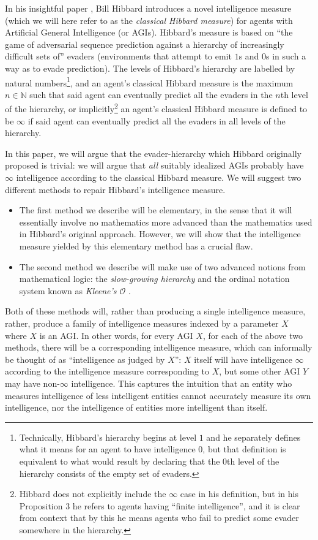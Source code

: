 \documentclass{article}
\begin{document}
In his insightful paper \cite{hibbard}, Bill Hibbard introduces a novel
intelligence measure (which we will here refer to as the \emph{classical Hibbard measure})
for agents with Artificial General Intelligence (or AGIs).
Hibbard's measure is based on ``the game of adversarial sequence prediction
against a hierarchy of increasingly difficult sets of'' evaders (environments that attempt
to emit $1$s and $0$s in such a way as to evade prediction).
The levels of Hibbard's hierarchy are labelled by natural numbers\footnote{Technically,
Hibbard's hierarchy begins at level $1$ and he separately defines what it means for
an agent to have intelligence $0$, but that definition is equivalent to what would result
by declaring that the $0$th level of the hierarchy consists of the empty set of evaders.}, and
an agent's classical Hibbard measure is the maximum $n\in\mathbb N$ such that
said agent can eventually predict all the evaders in the $n$th level of the hierarchy,
or implicitly\footnote{Hibbard does not explicitly include the $\infty$ case in his
definition, but in his Proposition 3 he refers to agents having ``finite intelligence'', and
it is clear from context that by this he means agents who fail to predict some evader
somewhere in the hierarchy.} an agent's classical Hibbard measure is defined to be $\infty$
if said agent can eventually predict all the evaders in all levels of the hierarchy.

In this paper, we will argue that the evader-hierarchy which Hibbard originally proposed is
trivial: we will argue that \emph{all} suitably idealized AGIs probably have $\infty$
intelligence according to the classical Hibbard measure.
We will suggest two different methods to repair Hibbard's intelligence measure.
\begin{itemize}
    \item
    The first method we describe will be elementary, in the sense that it will
    essentially involve
    no mathematics more advanced than the mathematics used in Hibbard's original approach.
    However, we will show that the intelligence measure yielded by this elementary
    method has a crucial flaw.
    \item
    The second method we describe will make use of two advanced notions from
    mathematical logic: the \emph{slow-growing hierarchy}
    \cite{weiermann2002slow} and the ordinal notation system known as
    \emph{Kleene's $\mathcal O$} \cite{kleene1938notation}.
\end{itemize}
Both of these methods will, rather than producing a single intelligence measure,
rather, produce a family of intelligence measures indexed by a parameter $X$ where
$X$ is an AGI. In other words, for every AGI $X$, for each of the above two methods,
there will be a corresponding intelligence measure, which can informally be thought
of as ``intelligence as judged by $X$'': $X$ itself will have intelligence $\infty$
according to the intelligence measure corresponding to $X$, but some other AGI $Y$
may have non-$\infty$ intelligence. This captures the intuition that an entity who
measures intelligence of less intelligent entities cannot accurately measure
its own intelligence, nor the intelligence of entities more intelligent than itself.
\end{document}
